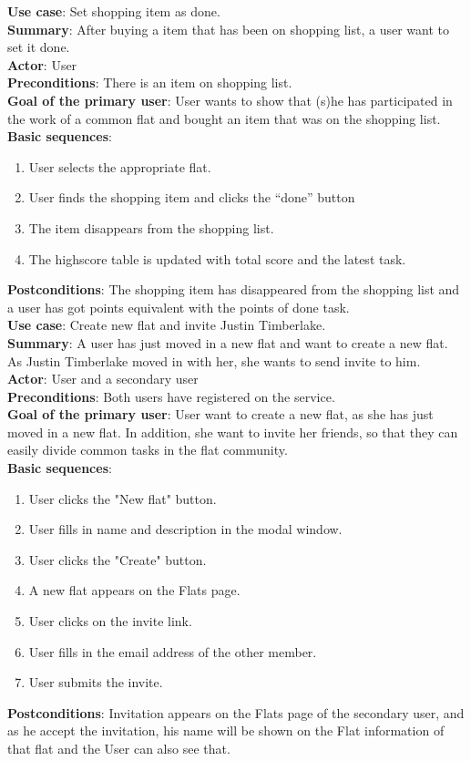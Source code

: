 \documentclass{sig-alt-release2}
\begin{document}
\textbf{Use case}: Set shopping item as done. \\
\textbf{Summary}: After buying a item that has been on shopping list, a user want to set it done. \\
\textbf{Actor}: User \\
\textbf{Preconditions}: There is an item on shopping list. \\
\textbf{Goal of the primary user}: User wants to show that (s)he has participated in the work of a common flat and bought an item that was on the shopping list. \\
\textbf{Basic sequences}:
\begin{enumerate}
\item User selects the appropriate flat.
\item User finds the shopping item and clicks the “done” button
\item The item disappears from the shopping list.
\item The highscore table is updated with total score and the latest task.
\end{enumerate}
\textbf{Postconditions}: The shopping item has disappeared from the shopping list and a user has got points equivalent with the points of done task. \\

\textbf{Use case}: Create new flat and invite Justin Timberlake. \\
\textbf{Summary}: A user has just moved in a new flat and want to create a new flat. As Justin Timberlake moved in with her, she wants to send invite to him. \\
\textbf{Actor}: User and a secondary user \\
\textbf{Preconditions}: Both users have registered on the service.  \\
\textbf{Goal of the primary user}: User want to create a new flat, as she has just moved in a new flat. In addition, she want to invite her friends, so that they can easily divide common tasks in the flat community. \\
\textbf{Basic sequences}:
\begin{enumerate}
\item User clicks the "New flat" button.
\item User fills in name and description in the modal window.
\item User clicks the "Create" button.
\item A new flat appears on the Flats page.
\item User clicks on the invite link.
\item User fills in the email address of the other member.
\item User submits the invite.
\end{enumerate}
\textbf{Postconditions}: Invitation appears on the Flats page of the secondary user, and as he accept the invitation, his name will be shown on the Flat information of that flat and the User can also see that. \\
\end{document}
